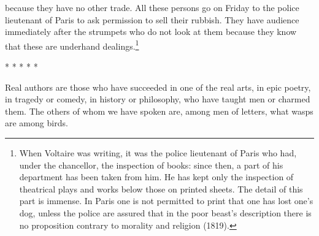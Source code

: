 because they have no other trade. All these persons go on Friday to the
police lieutenant of Paris to ask permission to sell their rubbish. They
have audience immediately after the strumpets who do not look at them
because they know that these are underhand dealings.\footnote{When Voltaire was writing, it was the police lieutenant of Paris who
had, under the chancellor, the inspection of books: since then, a part
of his department has been taken from him. He has kept only the
inspection of theatrical plays and works below those on printed sheets.
The detail of this part is immense. In Paris one is not permitted to
print that one has lost one's dog, unless the police are assured that in
the poor beast's description there is no proposition contrary to
morality and religion (1819).}

\begin{center}
       *       *       *       *       *
\end{center}
Real authors are those who have succeeded in one of the real arts, in
epic poetry, in tragedy or comedy, in history or philosophy, who have
taught men or charmed them. The others of whom we have spoken are, among
men of letters, what wasps are among birds.
